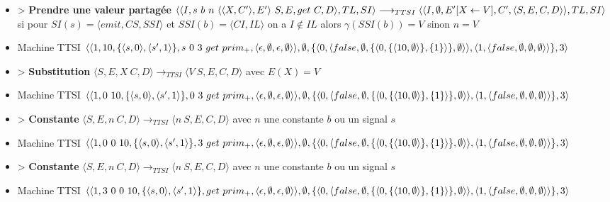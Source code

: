 \documentclass[10pt,a4paper]{report}
\begin{document}
\begin{itemize}
 				\item[] > \textbf{Prendre une valeur partagée} $\langle\langle I,s~b~n~\langle\langle X,C'\rangle,E'\rangle~S,E,get~C,D\rangle,TL,SI\rangle 
 				\longrightarrow_{TTSI} 
 				\\\langle\langle I,\emptyset,E'[X \leftarrow V],C',\langle S,E,C,D\rangle\rangle,TL,SI\rangle$
 				\\ si pour $SI(s) = \langle emit,CS,SSI\rangle$ et $SSI(b) = \langle CI,IL\rangle$ on a $I \notin IL$ alors $\gamma(SSI(b)) = V$ sinon $n = V$
 				\item[] Machine TTSI $\langle\langle 1,10,\{\langle s,0\rangle,\langle s',1\rangle\},s~0~3~get~prim_{+} ,\langle\epsilon,\emptyset,\epsilon,\emptyset\rangle\rangle,\emptyset,\{\langle 0,\langle false,\emptyset,\{\langle 0,\{\langle 10,\emptyset\rangle\},\{1\}\rangle\},\emptyset\rangle\rangle,\\\langle 1,\langle false,\emptyset,\emptyset,\emptyset\rangle\rangle\},3\rangle$ 
 				\item[] > \textbf{Substitution} $\langle S,E,X~C,D\rangle
 				\longrightarrow_{TTSI} 
 				\langle V~S,E,C,D\rangle$ avec $E(X) = V$
 				\item[] Machine TTSI $\langle\langle 1,0~10,\{\langle s,0\rangle,\langle s',1\rangle\},0~3~get~prim_{+} ,\langle\epsilon,\emptyset,\epsilon,\emptyset\rangle\rangle,\emptyset,\{\langle 0,\langle false,\emptyset,\{\langle 0,\{\langle 10,\emptyset\rangle\},\{1\}\rangle\},\emptyset\rangle\rangle,\\\langle 1,\langle false,\emptyset,\emptyset,\emptyset\rangle\rangle\},3\rangle$ 
 				\item[] > \textbf{Constante} $\langle S,E,n~C,D\rangle 
 				\longrightarrow_{TTSI} 
 				\langle n~S,E,C,D\rangle$ avec $n$ une constante $b$ ou un signal $s$
 				\item[] Machine TTSI $\langle\langle 1,0~0~10,\{\langle s,0\rangle,\langle s',1\rangle\},3~get~prim_{+} ,\langle\epsilon,\emptyset,\epsilon,\emptyset\rangle\rangle,\emptyset,\{\langle 0,\langle false,\emptyset,\{\langle 0,\{\langle 10,\emptyset\rangle\},\{1\}\rangle\},\emptyset\rangle\rangle,\\\langle 1,\langle false,\emptyset,\emptyset,\emptyset\rangle\rangle\},3\rangle$ 
 				\item[] > \textbf{Constante} $\langle S,E,n~C,D\rangle 
 				\longrightarrow_{TTSI} 
 				\langle n~S,E,C,D\rangle$ avec $n$ une constante $b$ ou un signal $s$
 				\item[] Machine TTSI $\langle\langle 1,3~0~0~10,\{\langle s,0\rangle,\langle s',1\rangle\},get~prim_{+} ,\langle\epsilon,\emptyset,\epsilon,\emptyset\rangle\rangle,\emptyset,\{\langle 0,\langle false,\emptyset,\{\langle 0,\{\langle 10,\emptyset\rangle\},\{1\}\rangle\},\emptyset\rangle\rangle,\\\langle 1,\langle false,\emptyset,\emptyset,\emptyset\rangle\rangle\},3\rangle$ 

\end{itemize}
\end{document}
